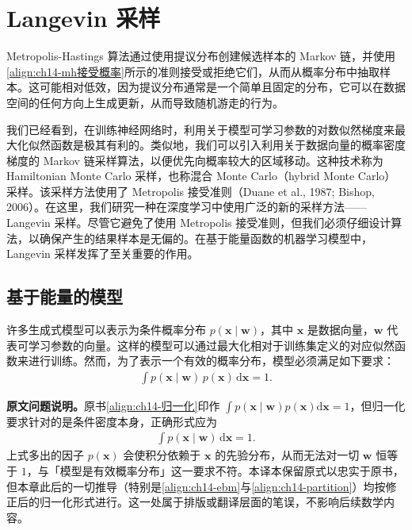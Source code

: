 \documentclass[../../main.tex]{subfiles}
\begin{document}
\section{Langevin 采样}\label{section:ch14-langevin采样}

Metropolis-Hastings 算法通过使用提议分布创建候选样本的 Markov 链，并使用\eqref{align:ch14-mh接受概率}所示的准则接受或拒绝它们，从而从概率分布中抽取样本。这可能相对低效，因为提议分布通常是一个简单且固定的分布，它可以在数据空间的任何方向上生成更新，从而导致随机游走的行为。

我们已经看到，在训练神经网络时，利用关于模型可学习参数的对数似然梯度来最大化似然函数是极其有利的。类似地，我们可以引入利用关于数据向量的概率密度梯度的 Markov 链采样算法，以便优先向概率较大的区域移动。这种技术称为 Hamiltonian Monte Carlo 采样，也称混合 Monte Carlo（hybrid Monte Carlo）采样。该采样方法使用了 Metropolis 接受准则（Duane et al., 1987; Bishop, 2006）。在这里，我们研究一种在深度学习中使用广泛的新的采样方法——Langevin 采样。尽管它避免了使用 Metropolis 接受准则，但我们必须仔细设计算法，以确保产生的结果样本是无偏的。在基于能量函数的机器学习模型中，Langevin 采样发挥了至关重要的作用。

\subsection{基于能量的模型}\label{subsection:ch14-基于能量的模型}

许多生成式模型可以表示为条件概率分布 $p(\bm{x}\mid\bm{w})$，其中 $\bm{x}$ 是数据向量，$\bm{w}$ 代表可学习参数的向量。这样的模型可以通过最大化相对于训练集定义的对应似然函数来进行训练。然而，为了表示一个有效的概率分布，模型必须满足如下要求：
\begin{align}
\int p(\bm{x}\mid\bm{w})\,p(\bm{x})\,\mathrm{d}\bm{x}=1.
\label{align:ch14-归一化}
\end{align}

\begin{remark}\textbf{原文问题说明。}原书\eqref{align:ch14-归一化}印作 $\int p(\bm{x}\mid\bm{w})p(\bm{x})\mathrm{d}\bm{x}=1$，但归一化要求针对的是条件密度本身，正确形式应为
\begin{align*}
\int p(\bm{x}\mid\bm{w})\,\mathrm{d}\bm{x}=1.
\end{align*}
上式多出的因子 $p(\bm{x})$ 会使积分依赖于 $\bm{x}$ 的先验分布，从而无法对一切 $\bm{w}$ 恒等于 $1$，与「模型是有效概率分布」这一要求不符。本译本保留原式以忠实于原书，但本章此后的一切推导（特别是\eqref{align:ch14-ebm}与\eqref{align:ch14-partition}）均按修正后的归一化形式进行。这一处属于排版或翻译层面的笔误，不影响后续数学内容。
\end{remark}
\end{document}
